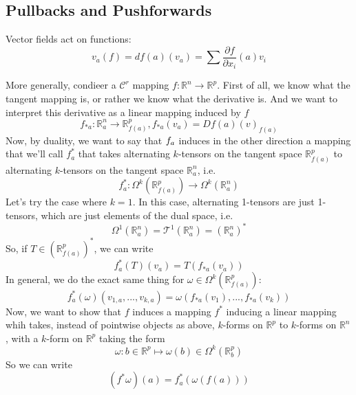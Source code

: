 \documentclass{article}
\newcommand{\reals}[0]{\mathbb{R}}
\newcommand{\mc}[1]{\mathcal{#1}}
\newcommand{\prt}[2]{\frac{\partial #1}{\partial #2}}
\begin{document}
\subsection{Pullbacks and Pushforwards}

Vector fields act on functions:
\begin{equation}
  v_a(f) = df(a)(v_a) = \sum\prt{f}{x_i}(a)v_i
\end{equation}

More generally, condieer a \(\mc{C}^r\) mapping \(f: \reals^n \to \reals^p\). First of all, we know what the tangent mapping is, or rather we know what the derivative is. And we want to interpret this derivative as a linear mapping induced by \(f\)
\begin{equation}
  f_{*a}: \reals^n_a \to \reals^p_{f(a)}, f_{*a}(v_a) = Df(a)(v)_{f(a)}
\end{equation}
Now, by duality, we want to say that \(f_{\*a}\) induces in the other direction a mapping that we'll call \(f^*_a\) that takes alternating \(k\)-tensors on the tangent space \(\reals^p_{f(a)}\) to alternating \(k\)-tensors on the tangent space \(\reals^n_a\), i.e.
\begin{equation}
  f_a^*: \Omega^k(\reals^p_{f(a)}) \to \Omega^k(\reals^n_a)
\end{equation}
Let's try the case where \(k = 1\). In this case, alternating 1-tensors are just 1-tensors, which are just elements of the dual space, i.e.
\begin{equation}
  \Omega^1(\reals^n_a) = \mc{T}^1(\reals^n_a) = (\reals^n_a)^*
\end{equation}
So, if \(T \in (\reals^p_{f(a)})^*\), we can write
\begin{equation}
  f_a^*(T)(v_a) = T(f_{*a}(v_a))
\end{equation}
In general, we do the exact same thing for \(\omega \in \Omega^k(\reals^p_{f(a)})\):
\begin{equation}
  f_a^*(\omega)(v_{1,a},...,v_{k,a}) = \omega(f_{*a}(v_1),...,f_{*a}(v_k))
\end{equation}
Now, we want to show that \(f\) induces a mapping \(f^*\) inducing a linear mapping whih takes, instead of pointwise objects as above, \(k\)-forms on \(\reals^p\) to \(k\)-forms on \(\reals^n\), with a \(k\)-form on \(\reals^p\) taking the form
\begin{equation}
  \omega: b \in \reals^p \mapsto \omega(b) \in \Omega^k(\reals^p_b)
\end{equation}
So we can write
\begin{equation}
  (f^*\omega)(a) = f^*_a(\omega(f(a)))
  \label{novs}
\end{equation}
\end{document}
